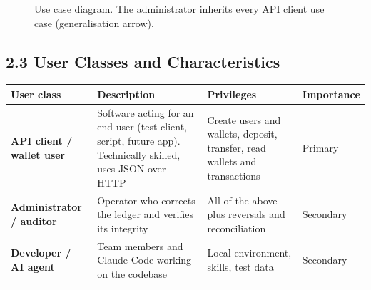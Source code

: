 \documentclass[11pt,a4paper]{article}
\newcounter{none} %
\begin{document}
\begin{figure}[!htbp]
{}
\caption{Use case diagram. The administrator inherits every API client use case (generalisation arrow).}
\label{fig:use-case}
\end{figure}

\subsection{2.3 User Classes and Characteristics}\label{user-classes-and-characteristics}

{\def\LTcaptype{none} %
\begin{longtable}[]{@{}
  >{\raggedright\arraybackslash}p{}
  >{\raggedright\arraybackslash}p{}
  >{\raggedright\arraybackslash}p{}
  >{\raggedright\arraybackslash}p{}@{}}
\toprule\noalign{}
\begin{minipage}[b]{\linewidth}\raggedright
User class
\end{minipage} & \begin{minipage}[b]{\linewidth}\raggedright
Description
\end{minipage} & \begin{minipage}[b]{\linewidth}\raggedright
Privileges
\end{minipage} & \begin{minipage}[b]{\linewidth}\raggedright
Importance
\end{minipage} \\
\midrule\noalign{}
\endhead
\bottomrule\noalign{}
\endlastfoot
\textbf{API client / wallet user} & Software acting for an end user (test client, script, future app). Technically skilled, uses JSON over HTTP & Create users and wallets, deposit, transfer, read wallets and transactions & Primary \\
\textbf{Administrator / auditor} & Operator who corrects the ledger and verifies its integrity & All of the above plus reversals and reconciliation & Secondary \\
\textbf{Developer / AI agent} & Team members and Claude Code working on the codebase & Local environment, skills, test data & Secondary \\
\end{longtable}
}
\end{document}
